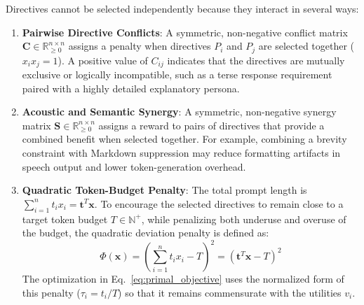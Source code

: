 \documentclass[review,12pt,times,authoryear]{elsarticle}
\theoremstyle{definition}
\begin{document}
Directives cannot be selected independently because they interact in several ways:
\begin{enumerate}[noitemsep]
  \item \textbf{Pairwise Directive Conflicts}: A symmetric, non-negative conflict matrix $\mathbf{C} \in \mathbb{R}_{\ge 0}^{n \times n}$ assigns a penalty when directives $P_i$ and $P_j$ are selected together ($x_i x_j = 1$). A positive value of $C_{ij}$ indicates that the directives are mutually exclusive or logically incompatible, such as a terse response requirement paired with a highly detailed explanatory persona.
  \item \textbf{Acoustic and Semantic Synergy}: A symmetric, non-negative synergy matrix $\mathbf{S} \in \mathbb{R}_{\ge 0}^{n \times n}$ assigns a reward to pairs of directives that provide a combined benefit when selected together. For example, combining a brevity constraint with Markdown suppression may reduce formatting artifacts in speech output and lower token-generation overhead.
  \item \textbf{Quadratic Token-Budget Penalty}: The total prompt length is $\sum_{i=1}^n t_i x_i = \bm{t}^T \bm{x}$. To encourage the selected directives to remain close to a target token budget $T \in \mathbb{N}^+$, while penalizing both underuse and overuse of the budget, the quadratic deviation penalty is defined as:
  \begin{equation}
    \Phi(\bm{x}) = \left(\sum_{i=1}^n t_i x_i - T\right)^2 = \left(\bm{t}^T \bm{x} - T\right)^2
    \label{eq:budget_penalty}
  \end{equation}
  The optimization in Eq.~\eqref{eq:primal_objective} uses the normalized form of this penalty ($\tau_i = t_i/T$) so that it remains commensurate with the utilities $v_i$.
\end{enumerate}
\end{document}
